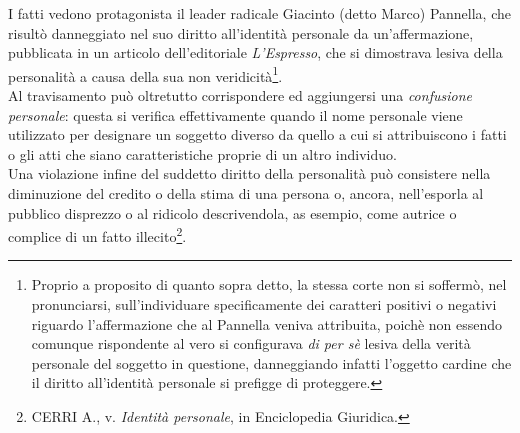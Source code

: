 I fatti vedono protagonista il leader radicale Giacinto (detto Marco) Pannella, che risultò danneggiato nel suo diritto all'identità personale da un'affermazione, pubblicata in un articolo dell'editoriale \textit{L'Espresso}, che si dimostrava lesiva della personalità a causa della sua non veridicità\footnote{Proprio a proposito di quanto sopra detto, la stessa corte non si soffermò, nel pronunciarsi, sull'individuare specificamente dei caratteri positivi o negativi riguardo l'affermazione che al Pannella veniva attribuita, poichè non essendo comunque rispondente al vero si configurava \textit{di per sè} lesiva della verità personale del soggetto in questione, danneggiando infatti l'oggetto cardine che il diritto all'identità personale si prefigge di proteggere.}.
\\Al travisamento può oltretutto corrispondere ed aggiungersi una \textit{confusione personale}: questa si verifica effettivamente quando il nome personale viene utilizzato per designare un soggetto diverso da quello a cui si attribuiscono i fatti o gli atti che siano caratteristiche proprie di un altro individuo.
\\Una violazione infine del suddetto diritto della personalità può consistere nella diminuzione del credito o della stima di una persona o, ancora, nell’esporla al pubblico disprezzo o al ridicolo descrivendola, as esempio, come autrice o complice di un fatto illecito\footnote{CERRI A., v. \textit{Identità personale}, in Enciclopedia Giuridica.}.

